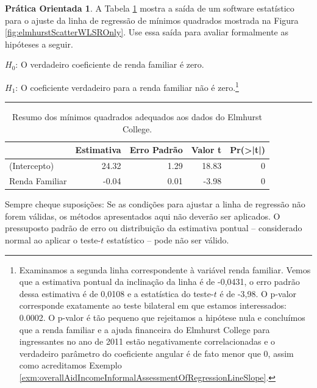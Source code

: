 \documentclass[
]{book}
\theoremstyle{definition}
\theoremstyle{definition}
\theoremstyle{definition}
\newtheorem{exercise}{Prática Orientada}[chapter]
\theoremstyle{definition}
\theoremstyle{remark}
\begin{document}
\begin{exercise}
\protect\hypertarget{exr:unnamed-chunk-284}{}{\label{exr:unnamed-chunk-284} }A Tabela \ref{tab:rOutputForIncomeAidLSRLineInInferenceSection} mostra a saída de um software estatístico para o ajuste da linha de regressão de mínimos quadrados mostrada na Figura \ref{fig:elmhurstScatterWLSROnly}. Use essa saída para avaliar formalmente as hipóteses a seguir.

\(H_0\): O verdadeiro coeficiente de renda familiar é zero.

\(H_1\): O coeficiente verdadeiro para a renda familiar não é zero.\footnote{Examinamos a segunda linha correspondente à variável renda familiar. Vemos que a estimativa pontual da inclinação da linha é de -0,0431, o erro padrão dessa estimativa é de 0,0108 e a estatística do teste-\(t\) é de -3,98. O p-valor corresponde exatamente ao teste bilateral em que estamos interessados: 0.0002. O p-valor é tão pequeno que rejeitamos a hipótese nula e concluímos que a renda familiar e a ajuda financeira do Elmhurst College para ingressantes no ano de 2011 estão negativamente correlacionadas e o verdadeiro parâmetro do coeficiente angular é de fato menor que 0, assim como acreditamos Exemplo \ref{exm:overallAidIncomeInformalAssessmentOfRegressionLineSlope}.}
\end{exercise}

\begin{center}\rule{0.5\linewidth}{0.5pt}\end{center}

\begin{table}

\caption{\label{tab:rOutputForIncomeAidLSRLineInInferenceSection}Resumo dos mínimos quadrados adequados aos dados do Elmhurst College.}
\centering
\begin{tabular}[t]{l|r|r|r|r}
\hline
  & Estimativa & Erro Padrão & Valor t & Pr(>|t|)\\
\hline
(Intercepto) & 24.32 & 1.29 & 18.83 & 0\\
\hline
Renda Familiar & -0.04 & 0.01 & -3.98 & 0\\
\hline
\end{tabular}
\end{table}

Sempre cheque suposições: Se as condições para ajustar a linha de regressão não forem válidas, os métodos apresentados aqui não deverão ser aplicados. O pressuposto padrão de erro ou distribuição da estimativa pontual -- considerado normal ao aplicar o teste-\(t\) estatístico -- pode não ser válido.
\end{document}
